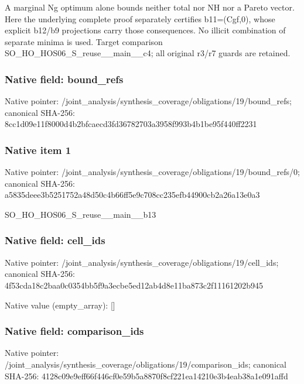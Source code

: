 \documentclass[10pt,a4paper]{article}
\begin{document}
\begingroup\raggedright\sloppy A marginal Ng optimum alone bounds neither total nor NH nor a Pareto vector. Here the underlying complete proof separately certifies b11=\allowbreak{}(Cgf,\allowbreak{}0),\allowbreak{} whose explicit b12/\allowbreak{}b9 projections carry those consequences. No illicit combination of separate minima is used. Target comparison SO\_\allowbreak{}HO\_\allowbreak{}HOS06\_\allowbreak{}S\_\allowbreak{}reuse\_\allowbreak{}\_\allowbreak{}main\_\allowbreak{}\_\allowbreak{}c4;\allowbreak{} all original r3/\allowbreak{}r7 guards are retained.\par\endgroup

\subsubsection{Native field: bound\_\allowbreak{}refs}
Native pointer: /joint\_\allowbreak{}analysis/synthesis\_\allowbreak{}coverage/obligations/19/bound\_\allowbreak{}refs; canonical SHA-256: 8cc1d09e11f8000d4b2bfcaecd3fd36782703a3958f993b4b1be95f440ff2231

\subsubsection{Native item 1}
Native pointer: /joint\_\allowbreak{}analysis/synthesis\_\allowbreak{}coverage/obligations/19/bound\_\allowbreak{}refs/0; canonical SHA-256: a5835deee3b5251752a48d50c4b66ff5e9c708cc235efb44900cb2a26a13e0a3

\begingroup\raggedright\sloppy SO\_\allowbreak{}HO\_\allowbreak{}HOS06\_\allowbreak{}S\_\allowbreak{}reuse\_\allowbreak{}\_\allowbreak{}main\_\allowbreak{}\_\allowbreak{}b13\par\endgroup

\subsubsection{Native field: cell\_\allowbreak{}ids}
Native pointer: /joint\_\allowbreak{}analysis/synthesis\_\allowbreak{}coverage/obligations/19/cell\_\allowbreak{}ids; canonical SHA-256: 4f53cda18c2baa0c0354bb5f9a3ecbe5ed12ab4d8e11ba873c2f11161202b945

Native value (empty\_\allowbreak{}array): []

\subsubsection{Native field: comparison\_\allowbreak{}ids}
Native pointer: /joint\_\allowbreak{}analysis/synthesis\_\allowbreak{}coverage/obligations/19/comparison\_\allowbreak{}ids; canonical SHA-256: 4128c09e9eff66f446cf0e59b5a8870f8cf221ea14210e3b4eab38a1e091affd
\end{document}
